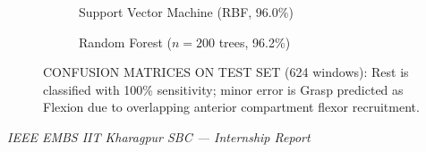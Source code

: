 \documentclass[12pt,a4paper]{article}
\begin{document}
\begin{figure}[htbp]
\centering
\begin{subfigure}[t]{0.48\textwidth}
\centering
{}
\caption{Support Vector Machine (RBF, 96.0\%)}
\label{fig:cm_svm}
\end{subfigure}
\hfill
\begin{subfigure}[t]{0.48\textwidth}
\centering
{}
\caption{Random Forest ($n=200$ trees, 96.2\%)}
\label{fig:cm_rf}
\end{subfigure}
\caption{CONFUSION MATRICES ON TEST SET (624 windows): Rest is classified with 100\% sensitivity; minor error is Grasp predicted as Flexion due to overlapping anterior compartment flexor recruitment.}
\label{fig:confusion_matrices}
\end{figure}

\vfill
\begin{center}
    \footnotesize\textit{IEEE EMBS IIT Kharagpur SBC --- Internship Report}
\end{center}
\end{document}
